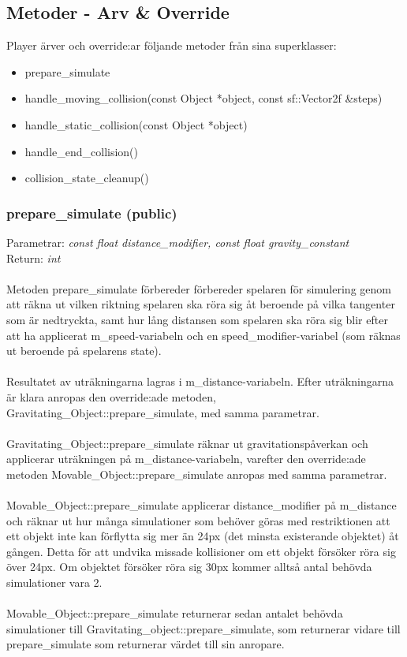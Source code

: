 \documentclass{TDP003mall}
\begin{document}
\subsection{Metoder - Arv \& Override}
Player ärver och override:ar följande metoder från sina superklasser:
\begin{itemize}
\item prepare\_simulate
\item handle\_moving\_collision(const Object *object, const sf::Vector2f \&steps)
\item handle\_static\_collision(const Object *object)
\item handle\_end\_collision()
\item collision\_state\_cleanup()
\end{itemize}

 \subsubsection{prepare\_simulate (public)}
Parametrar: \textit{const float distance\_modifier, const float gravity\_constant}
\\Return: \textit{int}
\\\\
Metoden prepare\_simulate förbereder förbereder spelaren för simulering genom att räkna ut vilken riktning spelaren ska röra sig åt beroende på vilka tangenter som är nedtryckta, samt hur lång distansen som spelaren ska röra sig blir efter att ha applicerat m\_speed-variabeln och en speed\_modifier-variabel (som räknas ut beroende på spelarens state).
\\\\
Resultatet av uträkningarna lagras i m\_distance-variabeln. Efter uträkningarna är klara anropas den override:ade metoden, Gravitating\_Object::prepare\_simulate, med samma parametrar.
\\\\
Gravitating\_Object::prepare\_simulate räknar ut gravitationspåverkan och applicerar uträkningen på m\_distance-variabeln, varefter den override:ade metoden Movable\_Object::prepare\_simulate anropas med samma parametrar.
\\\\
Movable\_Object::prepare\_simulate applicerar distance\_modifier på m\_distance och räknar ut hur många simulationer som behöver göras med restriktionen att ett objekt inte kan förflytta sig mer än 24px (det minsta existerande objektet) åt gången. Detta för att undvika missade kollisioner om ett objekt försöker röra sig över 24px. Om objektet försöker röra sig 30px kommer alltså antal behövda simulationer vara 2.
\\\\
Movable\_Object::prepare\_simulate returnerar sedan antalet behövda simulationer till Gravitating\_object::prepare\_simulate, som returnerar vidare till prepare\_simulate som returnerar värdet till sin anropare.
\end{document}
